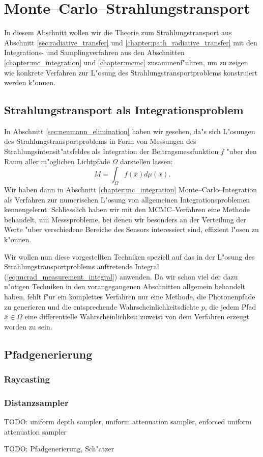 	\chapter{Monte--Carlo--Strahlungstransport}\label{sec:mc_radiativetransfer}
	In diesem Abschnitt wollen wir die Theorie zum Strahlungstransport aus Abschnitt \ref{sec:radiative_transfer} und \ref{chapter:path_radiative_transfer} mit den Integrations- und Samplingverfahren aus den Abschnitten \ref{chapter:mc_integration} und \ref{chapter:mcmc} zusammenf"uhren, um zu zeigen wie konkrete Verfahren zur L"osung des Strahlungstransportproblems konstruiert werden k"onnen.
	\section{Strahlungstransport als Integrationsproblem}
	In Abschnitt \ref{sec:neumann_elimination} haben wir gesehen, da"s sich L"osungen des Strahlungstransportproblems in Form von Messungen des Strahlungsintensit"atsfeldes als Integration der Beitragsmessfunktion $f$ "uber den Raum aller m"oglichen Lichtpfade $\Omega$ darstellen lassen:
	\begin{equation}
		M=\int_\Omega f({\overline x})d\mu({\overline x}).
		\label{eq:mcrad_measurement_integral}
	\end{equation}
	Wir haben dann in Abschnitt \ref{chapter:mc_integration} Monte--Carlo--Integration als Verfahren zur numerischen L"osung von allgemeinen Integrationsproblemen kennengelernt. Schliesslich haben wir mit den MCMC--Verfahren eine Methode behandelt, um Messsprobleme, bei denen wir besonders an der Verteilung der Werte "uber verschiedene Bereiche des Sensors interessiert sind, effizient l"osen zu k"onnen.
	
	Wir wollen nun diese vorgestellten Techniken speziell auf das in der L"osung des Strahlungstransportproblems auftretende Integral (\ref{eq:mcrad_measurement_integral}) anwenden. Da wir schon viel der dazu n"otigen Techniken in den vorangegangenen Abschnitten allgemein behandelt haben, fehlt f"ur ein komplettes Verfahren nur eine Methode, die Photonenpfade zu generieren und die entsprechende Wahrscheinlichkeitsdichte $p$, die jedem Pfad ${\overline x}\in\Omega$ eine differentielle Wahrscheinlichkeit zuweist von dem Verfahren erzeugt worden zu sein.
	\section{Pfadgenerierung}
	\subsection{Raycasting}
	\subsection{Distanzsampler}
	TODO: uniform depth sampler, uniform attenuation sampler, enforced uniform attenuation sampler
	
	TODO: Pfadgenerierung, Sch"atzer
	